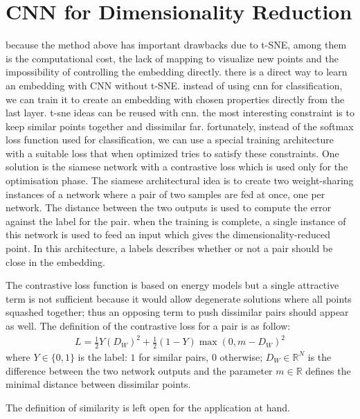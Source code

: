 \documentclass[a4paper,12pt]{report}
\newcommand{\R}{\mathbb{R}}
\begin{document}
\section{CNN for Dimensionality Reduction}
because the method above has important drawbacks due to t-SNE, among them is the computational cost, the lack of mapping to visualize new points and the impossibility of controlling the embedding directly.
there is a direct way to learn an embedding with CNN without t-SNE.
instead of using cnn for classification, we can train it to create an embedding with chosen properties directly from the last layer.
t-sne ideas can be reused with cnn.
the most interesting constraint is to keep similar points together and dissimilar far.
fortunately, instead of the softmax loss function used for classification, we can use a special training architecture with a suitable loss that when optimized tries to satisfy these constraints.
One solution is the siamese network with a contrastive loss which is used only for the optimisation phase.
The siamese architectural idea is to create two weight-sharing instances of a network where a pair of two samples are fed at once, one per network.
The distance between the two outputs is used to compute the error against the label for the pair.
when the training is complete, a single instance of this network is used to feed an input which gives the dimensionality-reduced point.
In this architecture, a labels describes whether or not a pair should be close in the embedding.

The contrastive loss function is based on energy models but a single attractive term is not sufficient because it would allow degenerate solutions where all points squashed together; thus an opposing term to push dissimilar pairs should appear as well.
The definition of the contrastive loss for a pair is as follow:
\begin{eqnarray}
    L = \frac{1}{2} Y (D_W)^2 + \frac{1}{2} (1-Y) \max(0, m - D_W)^2
\end{eqnarray}
where $Y \in \{0,1\}$ is the label: $1$ for similar pairs, $0$ otherwise; $D_W \in \R^N$ is the difference between the two network outputs and the parameter $m \in \R$ defines the minimal distance between dissimilar points.

The definition of similarity is left open for the application at hand.
\end{document}
